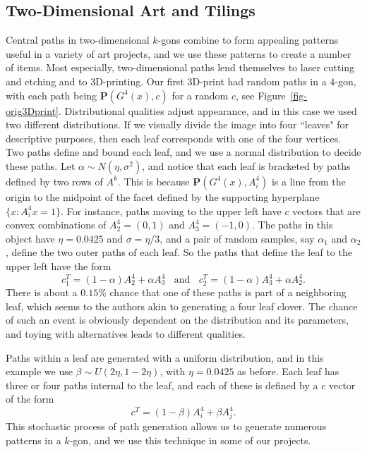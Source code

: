 \documentclass{article}
\def\bP{\mathbf{P}}
\begin{document}
\subsection{Two-Dimensional Art and Tilings} \label{sec-2Dart}

Central paths in two-dimensional $k$-gons combine to form
appealing patterns useful in a variety of art projects, and we use
these patterns to create a number of items. Most especially,
two-dimensional paths lend themselves to laser cutting and etching
and to 3D-printing. Our first 3D-print had random paths in a $4$-gon, with
each path being $\bP(G^4(x), c)$ for a random $c$, see Figure~\ref{fig-orig3Dprint}. 
Distributional qualities adjust appearance, and in this case we used two 
different distributions. If we visually divide the image into four ``leaves" for
descriptive purposes, then each leaf corresponds with one of the four vertices.
Two paths define and bound each leaf, and we use a normal distribution to decide
these paths. Let $\alpha \sim N(\eta, \sigma^2)$, and notice that each leaf is bracketed 
by paths defined by two rows of $A^k$. This is because $\bP(G^4(x), A^4_i)$ 
is a line from the origin to the midpoint of the facet defined by the supporting 
hyperplane $\{ x : A^4_i x = 1\}$. For instance, paths moving to 
the upper left have $c$ vectors that are convex combinations of 
$A^4_2 = (0,1)$ and $A^4_3 = (-1,0)$. The paths in this object have $\eta = 0.0425$ 
and $\sigma = \eta/3$, and a pair of random samples, say $\alpha_1$ and $\alpha_2$, define 
the two outer paths of each leaf. So the paths that define the leaf to the upper left
have the form
\[
c_1^T =  (1 - \alpha) A^4_2 + \alpha A^4_3 
    \;\; \mbox{ and } \;\; c^T_2 = (1 - \alpha) A^4_3 + \alpha A^4_2.
\]
There is about a $0.15\%$ chance that one of these paths is part of
a neighboring leaf, which seems to the authors akin to generating a four leaf 
clover. The chance of such an event is obviously dependent on the distribution and 
its parameters, and toying with alternatives leads to different qualities.

Paths within a leaf are generated with a uniform distribution,
and in this example we use $\beta \sim U(2\eta, 1-2\eta)$, with $\eta = 0.0425$ 
as before. Each leaf has three or four paths internal to the 
leaf, and each of these is defined by a $c$ vector of the form
\[
c^T = (1 - \beta) A^4_i + \beta A^4_j.
\]
This stochastic process of path generation allows us to generate numerous patterns
in a $k$-gon, and we use this technique in some of our projects.
\end{document}
